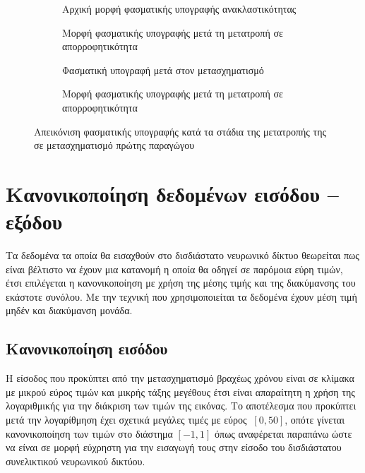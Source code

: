 \begin{figure}[H]
    \begin{subfigure}{0.5\textwidth}
        
        \caption{Αρχική μορφή φασματικής υπογραφής ανακλαστικότητας}
        \label{fig:abs_sg1_initial}
    \end{subfigure}
    \begin{subfigure}{0.5\textwidth}
        
        \caption{Μορφή φασματικής υπογραφής μετά τη μετατροπή σε απορροφητικότητα}
        \label{fig:abs_sg1_abs}
    \end{subfigure}
    \begin{subfigure}{0.5\textwidth}
        
        \caption{Φασματική υπογραφή μετά στον μετασχηματισμό \tl{}}
        \label{fig:abs_sg1_transform_notches}
    \end{subfigure}
    \begin{subfigure}{0.5\textwidth}
        
        \caption{Μορφή φασματικής υπογραφής μετά τη μετατροπή σε απορροφητικότητα}
        \label{fig:abs_sg1_transform_fixed}
    \end{subfigure}
    \caption{Απεικόνιση φασματικής υπογραφής κατά τα στάδια της μετατροπής της σε μετασχηματισμό  πρώτης παραγώγου}
\end{figure}


\section{Κανονικοποίηση δεδομένων εισόδου -- εξόδου}
Τα δεδομένα τα οποία θα εισαχθούν στο δισδιάστατο νευρωνικό δίκτυο θεωρείται πως είναι βέλτιστο να έχουν μια κατανομή η οποία θα οδηγεί σε παρόμοια εύρη τιμών, έτσι επιλέγεται η κανονικοποίηση με χρήση της μέσης τιμής και της διακύμανσης του εκάστοτε συνόλου. Με την τεχνική που χρησιμοποιείται τα δεδομένα έχουν μέση τιμή μηδέν και διακύμανση μονάδα.

\subsection{Κανονικοποίηση εισόδου}
Η είσοδος που προκύπτει από την μετασχηματισμό  βραχέως χρόνου είναι σε κλίμακα με μικρού εύρος τιμών και μικρής τάξης μεγέθους έτσι είναι απαραίτητη η χρήση της λογαριθμικής για την διάκριση των τιμών της εικόνας. Το αποτέλεσμα που προκύπτει μετά την λογαρίθμηση έχει σχετικά μεγάλες τιμές με εύρος $~[0,50]$, οπότε γίνεται κανονικοποίηση των τιμών στο διάστημα $[-1,1]$ όπως αναφέρεται παραπάνω ώστε να είναι σε μορφή εύχρηστη για την εισαγωγή τους στην είσοδο του δισδιάστατου συνελικτικού νευρωνικού δικτύου.
